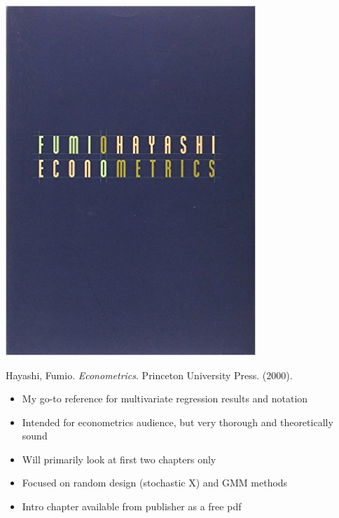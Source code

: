 \begin{frame}[fragile] \frametitle{}

\noindent
\begin{minipage}{0.5\textwidth}
\includegraphics[width=0.9\linewidth]{img/hayashi.jpg}
\end{minipage}%
\begin{minipage}{0.5\textwidth}
Hayashi, Fumio. {\it Econometrics}. Princeton University Press. (2000). \\
\begin{itemize}
\item My go-to reference for multivariate regression results and notation
\item Intended for econometrics audience, but very thorough and theoretically sound
\item Will primarily look at first two chapters only
\item Focused on random design (stochastic X) and GMM methods
\item Intro chapter available from publisher as a free pdf
\end{itemize}
\end{minipage}

\end{frame}

